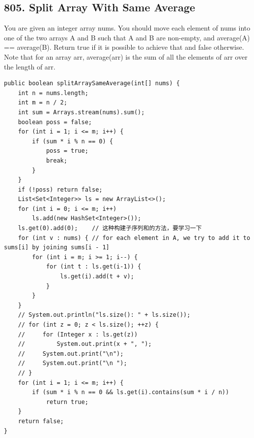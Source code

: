 \documentclass[9pt, b5paper]{article}
\begin{document}
\subsection{805. Split Array With Same Average}
\label{sec-4-41}
You are given an integer array nums.
You should move each element of nums into one of the two arrays A and B such that A and B are non-empty, and average(A) == average(B).
Return true if it is possible to achieve that and false otherwise.
Note that for an array arr, average(arr) is the sum of all the elements of arr over the length of arr.
\begin{verbatim}
public boolean splitArraySameAverage(int[] nums) {
    int n = nums.length;
    int m = n / 2;
    int sum = Arrays.stream(nums).sum();
    boolean poss = false;
    for (int i = 1; i <= m; i++) {
        if (sum * i % n == 0) {
            poss = true;
            break;
        }
    }
    if (!poss) return false;
    List<Set<Integer>> ls = new ArrayList<>();
    for (int i = 0; i <= m; i++) 
        ls.add(new HashSet<Integer>());
    ls.get(0).add(0);    // 这种构建子序列和的方法，要学习一下
    for (int v : nums) { // for each element in A, we try to add it to sums[i] by joining sums[i - 1]
        for (int i = m; i >= 1; i--) {
            for (int t : ls.get(i-1)) {
                ls.get(i).add(t + v);
            }
        }
    }
    // System.out.println("ls.size(): " + ls.size());
    // for (int z = 0; z < ls.size(); ++z) {
    //     for (Integer x : ls.get(z))
    //         System.out.print(x + ", ");
    //     System.out.print("\n");
    //     System.out.print("\n ");
    // }
    for (int i = 1; i <= m; i++) {
        if (sum * i % n == 0 && ls.get(i).contains(sum * i / n))
            return true;
    }
    return false;
}
\end{verbatim}
\end{document}
